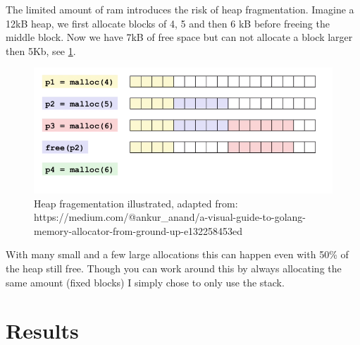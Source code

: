 \documentclass[lang=en, hanging-titles=true]{skrapport}
\begin{document}
The limited amount of ram introduces the risk of heap fragmentation. Imagine a 12kB heap, we first allocate blocks of 4, 5 and then 6 kB before freeing the middle block. Now we have 7kB of free space but can not allocate a block larger then 5Kb, see \cref{fig:heap}. 
%
\begin{figure}[htbp]
	\centering
	\includegraphics[width=0.9\linewidth]{figs/heapfrag}
	\caption{Heap fragementation illustrated, adapted from: https://medium.com/@ankur\_anand/a-visual-guide-to-golang-memory-allocator-from-ground-up-e132258453ed}
	\label{fig:heap}
\end{figure}
%
With many small and a few large allocations this can happen even with 50\% of the heap still free. Though you can work around this by always allocating the same amount (fixed blocks) I simply chose to only use the stack.



\section{Results}
\label{sec:results}

%
%
%
%
%

\clearpage
\appendix
% 
\printbibliography
\end{document}
